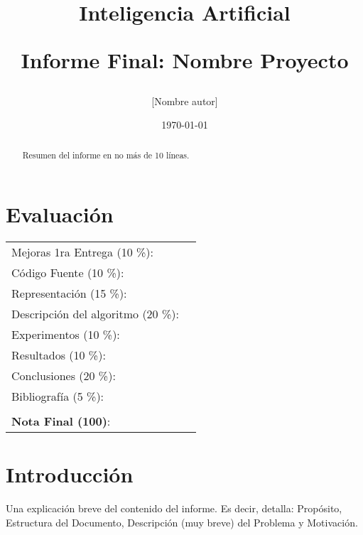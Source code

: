 \documentclass[letter, 10pt]{article}
\begin{document}
\title{Inteligencia Artificial \\ \begin{Large}Informe Final: Nombre Proyecto\end{Large}}
\author{[Nombre autor]}
\date{\today}
\maketitle


\section*{Evaluaci\'on}

\begin{tabular}{ll}
Mejoras 1ra Entrega (10 \%): &  \underline{\hspace{2cm}}\\
C\'odigo Fuente (10 \%): &  \underline{\hspace{2cm}}\\
Representaci\'on (15 \%):  & \underline{\hspace{2cm}} \\
Descripci\'on del algoritmo (20 \%):  & \underline{\hspace{2cm}} \\
Experimentos (10 \%):  & \underline{\hspace{2cm}} \\
Resultados (10 \%):  & \underline{\hspace{2cm}} \\
Conclusiones (20 \%): &  \underline{\hspace{2cm}}\\
Bibliograf\'ia (5 \%): & \underline{\hspace{2cm}}\\
 &  \\
\textbf{Nota Final (100)}:   & \underline{\hspace{2cm}}
\end{tabular}

\begin{abstract}
Resumen del informe en no m\'as de 10 l\'ineas.
\end{abstract}

\section{Introducci\'on}
Una explicaci\'on breve del contenido del informe. Es decir, detalla: Prop\'osito, Estructura del Documento, Descripci\'on (muy breve) del Problema y Motivaci\'on.
\end{document}
